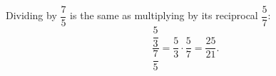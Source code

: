 Dividing by $\dfrac75$ is the same as multiplying by its reciprocal $\dfrac57$:
\[\dfrac{\dfrac53}{\dfrac75}=\dfrac53\cdot\dfrac57=\boxed{\dfrac{25}{21}}.\]
